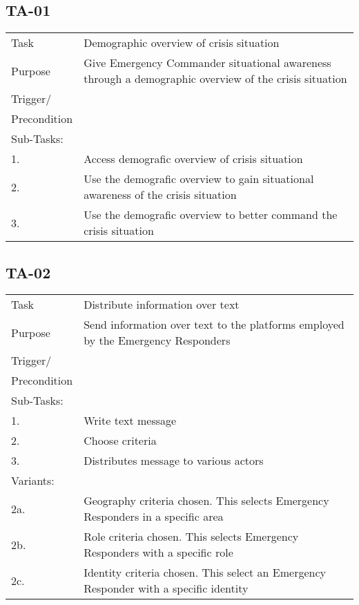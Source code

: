 \subsection{TA-01}
\begin{longtable}{| p{2.5cm}  | p{10cm} |  }
	\hline
	Task & Demographic overview of crisis situation  \\
	Purpose &  Give Emergency Commander situational awareness through a demographic overview of the crisis situation \\
	Trigger/ &  \\ Precondition &  \\
	\hline
	Sub-Tasks: & \\
	1. & Access demografic overview of crisis situation \\
	\hline
	2. & Use the demografic overview to gain situational awareness of the crisis situation \\
	\hline
	3. & Use the demografic overview to better command the crisis situation \\
	\hline
\end{longtable}


\subsection{TA-02}
\begin{longtable}{| p{2.5cm}  | p{10cm} |  }
	\hline
	Task & Distribute information over text \\
	Purpose & Send information over text to the platforms employed by the Emergency Responders \\
	Trigger/ &  \\ Precondition &  \\
	\hline
	Sub-Tasks: & \\
	1. & Write text message\\
	2. & Choose criteria \\
	3. & Distributes message to various actors \\
	\hline
	Variants: & \\
	2a. & Geography criteria chosen. This selects Emergency Responders in a specific area \\
	2b. & Role criteria chosen. This selects Emergency Responders with a specific role\\
	2c. & Identity criteria chosen. This select an Emergency Responder with a specific identity \\
	\hline
\end{longtable}

